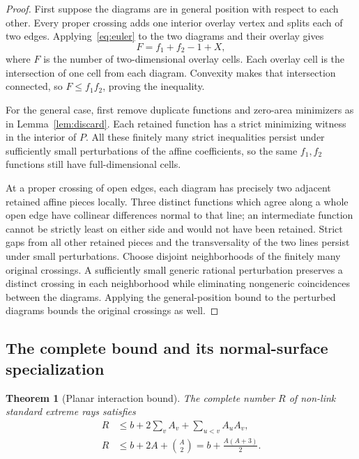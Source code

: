 \documentclass[11pt,letterpaper]{article}
\newtheorem{theorem}{Theorem}[section]
\theoremstyle{definition}
\theoremstyle{remark}\newtheorem{remark}[theorem]{Remark}
\begin{document}
\begin{proof}
First suppose the diagrams are in general position with respect to each
other. Every proper crossing adds one interior overlay vertex and splits
each of two edges. Applying~\eqref{eq:euler} to the two diagrams and their
overlay gives
\[
 F=f_1+f_2-1+X,
\]
where $F$ is the number of two-dimensional overlay cells. Each overlay
cell is the intersection of one cell from each diagram. Convexity makes
that intersection connected, so $F\le f_1f_2$, proving the inequality.

For the general case, first remove duplicate functions and zero-area
minimizers as in Lemma~\ref{lem:discard}. Each retained function has a
strict minimizing witness in the interior of $P$. All these finitely many
strict inequalities persist under sufficiently small perturbations of the
affine coefficients, so the same $f_1,f_2$ functions still have
full-dimensional cells.

At a proper crossing of open edges, each diagram has precisely two
adjacent retained affine pieces locally. Three distinct functions which
agree along a whole open edge have collinear differences normal to that
line; an intermediate function cannot be strictly least on either side
and would not have been retained. Strict gaps from all other retained
pieces and the transversality of the two lines persist under small
perturbations. Choose disjoint neighborhoods of the finitely many original
crossings. A sufficiently small generic rational perturbation preserves a
distinct crossing in each neighborhood while eliminating nongeneric
coincidences between the diagrams. Applying the general-position bound to
the perturbed diagrams bounds the original crossings as well.
\end{proof}

\subsection{The complete bound and its normal-surface specialization}

\begin{theorem}[Planar interaction bound]
\label{thm:main}
The complete number $R$ of non-link standard extreme rays satisfies
\begin{align}
 R&\le b+2\sum_v A_v+\sum_{u<v}A_uA_v,
       \label{eq:sharpbound}\\
 R&\le b+2A+\binom A2
       =b+\frac{A(A+3)}2.
       \label{eq:coarsebound}
\end{align}
\end{theorem}
\end{document}
